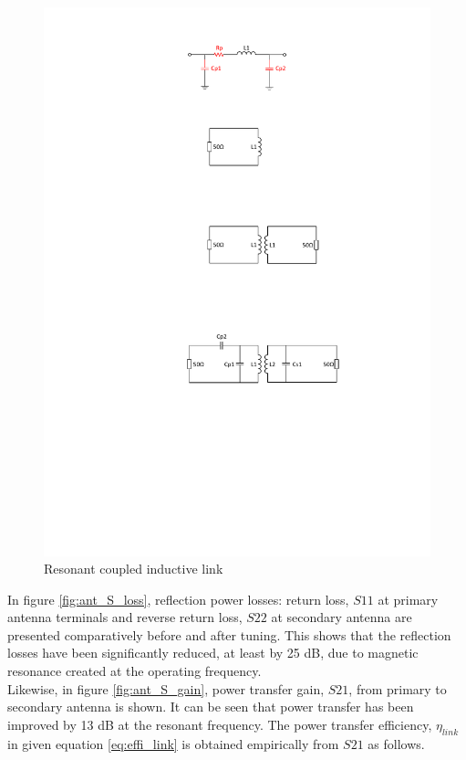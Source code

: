 \documentclass[12pt,a4paper,UKenglish]{report}
\begin{document}
\begin{figure}[!htb] %
   \centering
   \includegraphics[width=\textwidth]{img/ant_couple_resonant.pdf} 
   \caption{Resonant coupled inductive link}
   \label{fig:ant_couple_resonant}
\end{figure}

In figure \ref{fig:ant_S_loss}, reflection power losses:  return loss, $S11$ at primary antenna terminals and reverse return loss, $S22$ at secondary antenna are presented comparatively before and after tuning. This shows that the reflection losses have been significantly reduced, at least by 25 dB, due to magnetic resonance created at the operating frequency. \\

Likewise, in figure \ref{fig:ant_S_gain}, power transfer gain, $S21$, from primary to secondary antenna is shown. It can be seen that  power transfer has been improved by 13 dB at the resonant frequency. The power transfer efficiency, $\eta_{link}$ in given equation \ref{eq:effi_link} is obtained empirically from $S21$ as follows.
\end{document}
